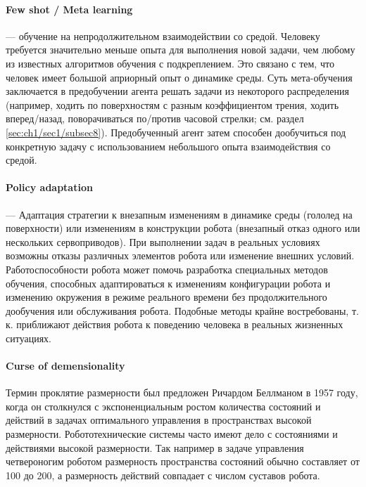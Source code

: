 \paragraph{Few shot / Meta learning} --- обучение на непродолжительном взаимодействии со средой. Человеку требуется значительно меньше опыта для выполнения новой задачи, чем любому из известных алгоритмов обучения с подкреплением. Это связано с тем, что человек имеет большой априорный опыт о динамике среды. Суть мета-обучения заключается в предобучении агента решать задачи из некоторого распределения (например, ходить по поверхностям с разным коэффициентом трения, ходить вперед/назад, поворачиваться по/против часовой стрелки; см. раздел \ref{sec:ch1/sec1/subsec8}). Предобученный агент затем способен дообучиться под конкретную задачу с использованием небольшого опыта взаимодействия со средой. 

\paragraph{Policy adaptation} --- Адаптация стратегии к внезапным изменениям в динамике среды (гололед на поверхности) или изменениям в конструкции робота (внезапный отказ одного или нескольких сервоприводов). При выполнении задач в реальных условиях возможны отказы различных элементов робота или изменение внешних условий. Работоспособности робота может помочь разработка специальных методов обучения, способных адаптироваться к изменениям конфигурации робота и изменению окружения в режиме реального времени без продолжительного дообучения или обслуживания робота. Подобные методы крайне востребованы, т. к. приближают действия робота к поведению человека в реальных жизненных ситуациях.

\paragraph{Curse of demensionality}

Термин проклятие размерности был предложен Ричардом Беллманом в 1957 году, когда он столкнулся с экспоненциальным ростом количества состояний и действий в задачах оптимального управления в пространствах высокой размерности. Робототехнические системы часто имеют дело с состояниями и действиями высокой размерности. Так например в задаче управления четвероногим роботом размерность пространства состояний обычно составляет от 100 до 200, а размерность действий совпадает с числом суставов робота. 

